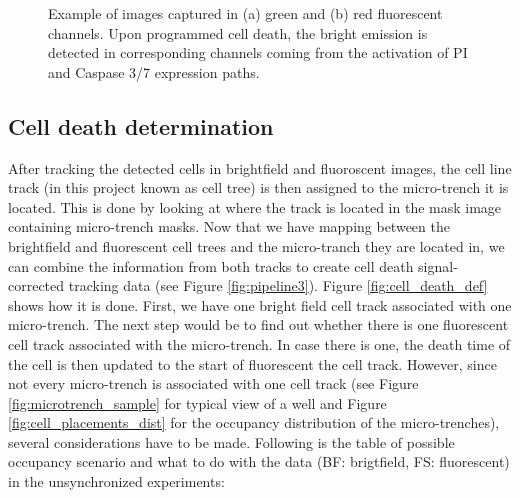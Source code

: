\documentclass[pdftex,12pt,a4paper]{report}
\begin{document}
\begin{figure}[H]
\caption[Example of images from green and red fluorescent channels]{Example of images captured in (a) green and (b) red fluorescent channels. Upon programmed cell death, the bright emission is detected in corresponding channels coming from the activation of PI and Caspase 3/7 expression paths.}

\label{fig:onset_samples}
\end{figure}

\subsection{Cell death determination}
\label{subsection:cell_death_determination}

After tracking the detected cells in brightfield and fluoroscent images, the cell line track (in this project known as cell tree) is then assigned to the micro-trench it is located. This is done by looking at where the track is located in the mask image containing micro-trench masks. Now that we have mapping between the brightfield and fluorescent cell trees and the micro-tranch they are located in, we can combine the information from both tracks to create cell death signal-corrected tracking data  (see Figure \ref{fig:pipeline3}). Figure \ref{fig:cell_death_def} shows how it is done. First, we have one bright field cell track associated with one micro-trench. The next step would be to find out whether there is one fluorescent cell track associated with the micro-trench. In case there is one, the death time of the cell is then updated to the start of fluorescent the cell track. However, since not every micro-trench is associated with one cell track (see Figure \ref{fig:microtrench_sample} for typical view of a well and Figure \ref{fig:cell_placements_dist} for the occupancy distribution of the micro-trenches), several considerations have to be made. Following is the table of possible occupancy scenario and what to do with the data (BF: brigtfield, FS: fluorescent) in the unsynchronized experiments:
\end{document}
